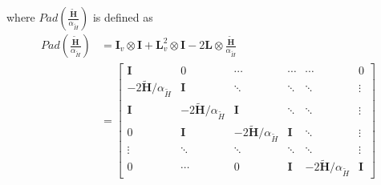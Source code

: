 where $Pad\left(\frac{\tilde{\textbf{H}}}{\alpha_{\tilde{H}}}\right)$ is defined as 
\begin{equation}
    \begin{split}
        Pad\left(\frac{\tilde{\textbf{H}}}{\alpha_{\tilde{H}}}\right) 
        &=\textbf{I}_v\otimes\textbf{I}+\textbf{L}_v^{2}\otimes\textbf{I}-2\textbf{L}\otimes\frac{\tilde{\textbf{H}}}{\alpha_{\tilde{H}}} \\
        &=\begin{bmatrix}
            \textbf{I}&0&\cdots&\cdots&\cdots&0\\
            -2\tilde{\textbf{H}}/\alpha_{\tilde{H}} & \textbf{I} & \ddots &\ddots &\ddots& \vdots \\
            \textbf{I}&-2\tilde{\textbf{H}}/\alpha_{\tilde{H}}&\textbf{I} &\ddots &\ddots &\vdots \\
            0& \textbf{I}& -2\tilde{\textbf{H}}/\alpha_{\tilde{H}} &\textbf{I} &\ddots &\vdots \\
            \vdots &\ddots &\ddots &\ddots &\ddots &\vdots \\
            0& \cdots &0 &\textbf{I} & -2\tilde{\textbf{H}}/\alpha_{\tilde{H}} &\textbf{I}
        \end{bmatrix}
    \end{split} 
    \label{eqn:PaddingMatrix}  
\end{equation}

